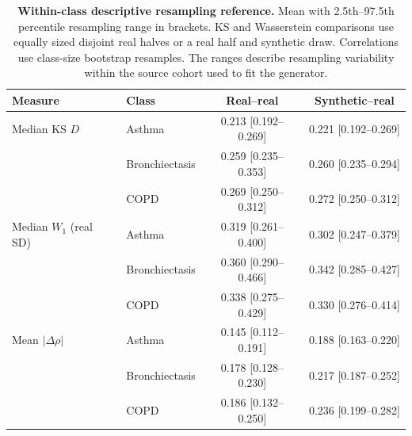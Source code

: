 \begin{table}[htbp]
\centering\small
\caption{\textbf{Within-class descriptive resampling reference.}
Mean with 2.5th--97.5th percentile resampling range in brackets.
KS and Wasserstein comparisons use equally sized disjoint real halves
or a real half and synthetic draw. Correlations use class-size bootstrap
resamples. The ranges describe resampling variability within the
source cohort used to fit the generator.}
\label{tab:reference}
\setlength{\tabcolsep}{4pt}
\begin{tabular}{llcc}
\toprule
Measure & Class & Real--real & Synthetic--real\\
\midrule
Median KS $D$ & Asthma & 0.213 [0.192--0.269] & 0.221 [0.192--0.269]\\
 & Bronchiectasis & 0.259 [0.235--0.353] & 0.260 [0.235--0.294]\\
 & COPD & 0.269 [0.250--0.312] & 0.272 [0.250--0.312]\\
\midrule
Median $W_1$ (real SD) & Asthma & 0.319 [0.261--0.400] & 0.302 [0.247--0.379]\\
 & Bronchiectasis & 0.360 [0.290--0.466] & 0.342 [0.285--0.427]\\
 & COPD & 0.338 [0.275--0.429] & 0.330 [0.276--0.414]\\
\midrule
Mean $|\Delta\rho|$ & Asthma & 0.145 [0.112--0.191] & 0.188 [0.163--0.220]\\
 & Bronchiectasis & 0.178 [0.128--0.230] & 0.217 [0.187--0.252]\\
 & COPD & 0.186 [0.132--0.250] & 0.236 [0.199--0.282]\\
\bottomrule\end{tabular}\end{table}
